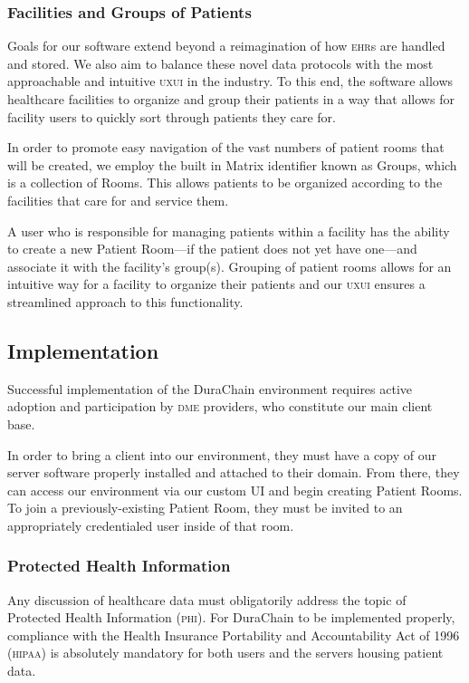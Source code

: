 \subsubsection{Facilities and Groups of Patients}
Goals for our software extend beyond a reimagination of how \textsc{ehr}s are handled and stored. We also aim to balance these novel data protocols with the most approachable and intuitive \textsc{uxui} in the industry. To this end, the software allows healthcare facilities to organize and group their patients in a way that allows for facility users to quickly sort through patients they care for.%

In order to promote easy navigation of the vast numbers of patient rooms that will be created, we employ the built in Matrix identifier known as Groups, which is a collection of Rooms. This allows patients to be organized according to the facilities that care for and service them.%

A user who is responsible for managing patients within a facility has the ability to create a new Patient Room---if the patient does not yet have one---and associate it with the facility's group(s). Grouping of patient rooms allows for an intuitive way for a facility to organize their patients and our \textsc{uxui} ensures a streamlined approach to this functionality.%

 \subsection{Implementation}
 Successful implementation of the DuraChain environment requires active adoption and participation by \textsc{dme} providers, who constitute our main client base.%

 In order to bring a client into our environment, they must have a copy of our server software properly installed and attached to their domain. From there, they can access our environment via our custom UI and begin creating Patient Rooms. To join a previously-existing Patient Room, they must be invited to an appropriately credentialed user inside of that room.%

\subsubsection{Protected Health Information}
Any discussion of healthcare data must obligatorily address the topic of Protected Health Information (\textsc{phi}). For DuraChain to be implemented properly, compliance with the Health Insurance Portability and Accountability Act of 1996 (\textsc{hipaa})\cite{HIPAA} is absolutely mandatory for both users and the servers housing patient data.%

